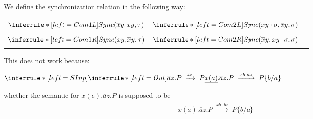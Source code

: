 \begin{definition}
  We define the synchronization relation in the following way:
  \begin{center}
    \begin{tabular}{ccc}
	  $\inferrule* [left=Com1L]{
	   }{
	    Sync(\overline{x}y,xy,\tau)
	  }$
	&
	  $\inferrule* [left=Com2L]{
	   }{
	    Sync(xy\cdot \sigma,\overline{x}y,\sigma)
	  }$	  
	&
      \\\\
	  $\inferrule* [left=Com1R]{
	   }{
	    Sync(xy,\overline{x}y,\tau)
	  }$
	&
	  $\inferrule* [left=Com2R]{
	   }{
	    Sync(\overline{x}y,xy\cdot \sigma,\sigma)
	  }$	  
	&
      \\\\
    \end{tabular}
  \end{center}
\end{definition}

This does not work because:
\begin{center}
  $
    \inferrule* [left=SInp]{
      \inferrule* [left=Out]{
      }{
	\overline{a}z.P\; \xrightarrow{\overline{a}z}\; P
      }
    }{
      \underline{x(a)}.\overline{a}z.P\; \xrightarrow{xb\cdot \overline{a}z}\; P\{b/a\}
    }
  $
\end{center}
whether the semantic for $\underline{x(a)}.\overline{a}z.P$ is supposed to be
\[
  \underline{x(a)}.\overline{a}z.P\; \xrightarrow{xb\cdot \overline{b}z}\; P\{b/a\}
\]



